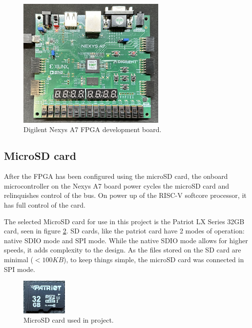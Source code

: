 \begin{figure}[h!]
    \centering
    \includegraphics[width=0.65\textwidth]{Images/nexysa7_board.jpg}
    \caption[Digilent Nexys A7 FPGA development board]{Digilent Nexys A7 FPGA development board.}
    \label{fig:fpga_dev_board}
\end{figure}

\newpage






\subsection{MicroSD card}

After the FPGA has been configured using the microSD card, the onboard microcontroller on the Nexys A7 board power cycles the microSD card and relinquishes control of the bus. On power up of the RISC-V softcore processor, it has full control of the card. 

The selected MicroSD card for use in this project is the Patriot LX Series 32GB card, seen in figure \ref{fig:microsd_card}. SD cards, like the patriot card have 2 modes of operation: native SDIO mode and SPI mode. While the native SDIO mode allows for higher speeds, it adds complexity to the design. As the files stored on the SD card are minimal ($< 100KB$), to keep things simple, the microSD card was connected in SPI mode.

\begin{figure}[h]
    \centering
    \includegraphics[width=0.2\textwidth]{Images/microsdcard.jpeg}
    \caption[MicroSD card used in project]{MicroSD card used in project.}
    \label{fig:microsd_card}
\end{figure}


